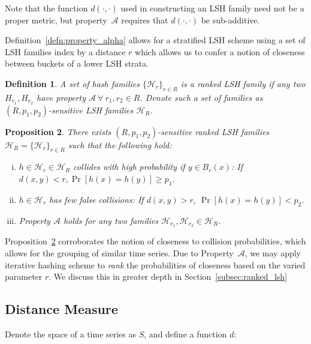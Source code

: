 \documentclass[a4paper]{article}
\newtheorem{definition}{Definition}
\newtheorem{proposition}[definition]{Proposition}
\begin{document}
Note that the function $d(\cdot,\cdot)$ used in constructing an LSH family need not be a proper metric, but property~$\mathscr{A}$ requires that $d(\cdot,\cdot)$ be sub-additive.

Definition~\ref{defn:property_alpha} allows for a stratified LSH scheme using a set of LSH families index by a distance $r$ which allows us to confer a notion of closeness between buckets of a lower LSH strata.

\begin{definition}\label{defn:ranked_lsh}
    A set of hash families ${\{\mathcal{H}_r\}}_{r\in R}$ is a ranked LSH family if any two $H_{r_1}, H_{r_2}$ have property $\mathscr{A}~\forall~r_1, r_2 \in R$.
    Denote such a set of families as $(R,p_1, p_2)$-sensitive LSH families $\mathcal{H}_R$.
\end{definition}

\begin{proposition}\label{prop:ranked_lsh}
    There exists $(R, p_1, p_2)$-sensitive ranked LSH families $\mathcal{H}_R = {\{\mathcal{H}_r\}}_{r\in R}$ such that the following hold:
    \begin{enumerate}[(i)]
        \item\label{itm:first}
            $h \in \mathcal{H}_r \in \mathcal{H}_R$ collides with high probability if $y \in B_r(x)$: If $d(x,y) < r, \Pr[h(x) = h(y)] \ge p_1$.
        \item\label{itm:second}
            $h \in \mathcal{H}_r$ has few false collisions: If $d(x,y) > r$, $\Pr[h(x) = h(y)] < p_2$.
        \item\label{itm:rank_property}
            Property $\mathscr{A}$ holds for any two families $\mathcal{H}_{r_1}, \mathcal{H}_{r_2} \in \mathcal{H}_R$.
    \end{enumerate}
\end{proposition}

Proposition~\ref{prop:ranked_lsh} corroborates the notion of closeness to collision probabilities, which allows for the grouping of similar time series.
Due to Property~$\mathscr{A}$, we may apply iterative hashing scheme to \textit{rank} the probabilities of closeness based on the varied parameter $r$.
We discuss this in greater depth in Section~\ref{subsec:ranked_lsh}

\subsection{Distance Measure}
Denote the space of a time series as $S$, and define a function $d$:
\end{document}
